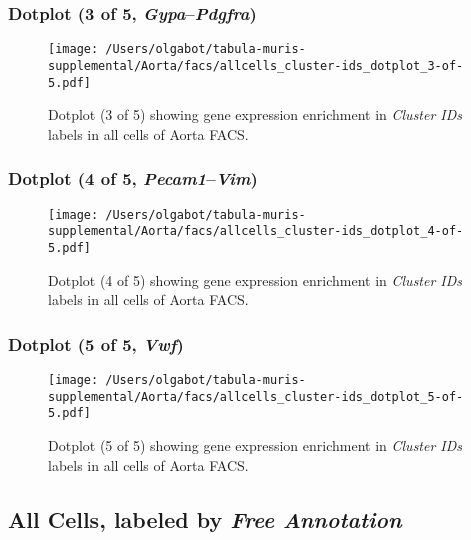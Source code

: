 \clearpage

\subsubsection{Dotplot (3 of 5, \emph{Gypa}--\emph{Pdgfra})}
\begin{figure}[h]
\centering
\texttt{[image: /Users/olgabot/tabula-muris-supplemental/Aorta/facs/allcells\_cluster-ids\_dotplot\_3-of-5.pdf]}

\caption{ Dotplot (3 of 5)  showing gene expression enrichment in \emph{Cluster IDs} labels in all cells of Aorta FACS. }
\end{figure}


\clearpage

\subsubsection{Dotplot (4 of 5, \emph{Pecam1}--\emph{Vim})}
\begin{figure}[h]
\centering
\texttt{[image: /Users/olgabot/tabula-muris-supplemental/Aorta/facs/allcells\_cluster-ids\_dotplot\_4-of-5.pdf]}

\caption{ Dotplot (4 of 5)  showing gene expression enrichment in \emph{Cluster IDs} labels in all cells of Aorta FACS. }
\end{figure}


\clearpage

\subsubsection{Dotplot (5 of 5, \emph{Vwf})}
\begin{figure}[h]
\centering
\texttt{[image: /Users/olgabot/tabula-muris-supplemental/Aorta/facs/allcells\_cluster-ids\_dotplot\_5-of-5.pdf]}

\caption{ Dotplot (5 of 5)  showing gene expression enrichment in \emph{Cluster IDs} labels in all cells of Aorta FACS. }
\end{figure}


\clearpage

\subsection{All Cells, labeled by \emph{Free Annotation}}
